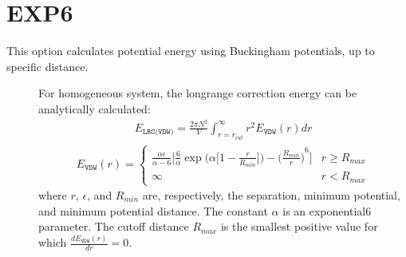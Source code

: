 \documentclass[letterpaper,10pt,english]{sphinxmanual}
\begin{document}
\section{EXP6}
\label{\detokenize{long_range_correction:exp6}}
\sphinxAtStartPar
This option calculates potential energy using Buckingham potentials, up to specific  distance.
\begin{description}
\item[{}] \leavevmode
\sphinxAtStartPar
For homogeneous system, the long\sphinxhyphen{}range correction energy can be analytically calculated:
\begin{equation*}
\begin{split}E_{\texttt{LRC(VDW)}} = \frac{2\pi N^2}{V} \int_{r=r_{cut}}^{\infty} r^2 E_{\texttt{VDW}}(r) dr\end{split}
\end{equation*}\begin{equation*}
\begin{split}E_{\texttt{VDW}}(r) =
\begin{cases}
  \frac{\alpha\epsilon}{\alpha-6} \bigg[\frac{6}{\alpha} \exp\bigg(\alpha \bigg[1-\frac{r}{R_{min}} \bigg]\bigg) - {\bigg(\frac{R_{min}}{r}\bigg)}^6 \bigg] &  r \geq R_{max} \\
  \infty & r < R_{max}
\end{cases}\end{split}
\end{equation*}
\sphinxAtStartPar
where \(r\), \(\epsilon\), and \(R_{min}\) are, respectively, the separation, minimum potential, and minimum potential distance.
The constant \(\alpha\) is an  exponential\sphinxhyphen{}6 parameter. The cutoff distance \(R_{max}\) is the smallest positive value for which \(\frac{dE_{\texttt{VDW}}(r)}{dr}=0\).


\end{description}
\end{document}
